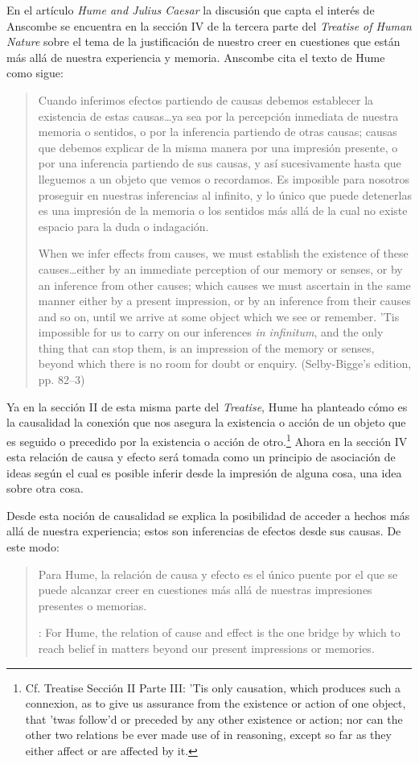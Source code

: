 En el artículo \emph{Hume and Julius Caesar} la discusión que capta el interés de Anscombe se encuentra en la sección IV de la tercera parte del \emph{Treatise of Human Nature} sobre el tema de la justificación de nuestro creer en cuestiones que están más allá de nuestra experiencia y memoria. Anscombe cita el texto de Hume como sigue: \blockquote[{\cite[86]{anscombe1981parmenides:humeandjulius}}When we infer effects from causes, we must establish the existence of these causes\ldots either by an immediate perception of our memory or senses, or by an inference from other causes; which causes we must ascertain in the same manner either by a present impression, or by an inference from their causes and so on, until we arrive at some object which we see or remember. 'Tis impossible for us to carry on our inferences \emph{in infinitum}, and the only thing that can stop them, is an impression of the memory or senses, beyond which there is no room for doubt or enquiry. (Selby-Bigge's edition, pp. 82--3)]{Cuando inferimos efectos partiendo de causas debemos establecer la existencia de estas causas\ldots ya sea por la percepción inmediata de nuestra memoria o sentidos, o por la inferencia partiendo de otras causas; causas que debemos explicar de la misma manera por una impresión presente, o por una inferencia partiendo de sus causas, y así sucesivamente hasta que lleguemos a un objeto que vemos o recordamos. Es imposible para nosotros proseguir en nuestras inferencias al infinito, y lo único que puede detenerlas es una impresión de la memoria o los sentidos más allá de la cual no existe espacio para la duda o indagación.}

Ya en la sección II de esta misma parte del \emph{Treatise}, Hume ha planteado cómo es la causalidad la conexión que nos asegura la existencia o acción de un objeto que es seguido o precedido por la existencia o acción de otro.\footnote{Cf. Treatise Sección II Parte III: ’Tis only causation, which produces such a connexion, as to give us assurance from the existence or action of one object, that ’twas follow’d or preceded by any other existence or action; nor can the other two relations be ever made use of in reasoning, except so far as they either affect or are affected by it. } Ahora en la sección IV esta relación de causa y efecto será tomada como un principio de asociación de ideas según el cual es posible inferir desde la impresión de alguna cosa, una idea sobre otra cosa.

Desde esta noción de causalidad se explica la posibilidad de acceder a hechos más allá de nuestra experiencia; estos son inferencias de efectos desde sus causas. De este modo: \blockquote[{\cite[87]{anscombe1981parmenides:humeandjulius}}: For Hume, the relation of cause and effect is the one bridge by which to reach belief in matters beyond our present impressions or memories.]{Para Hume, la relación de causa y efecto es el único puente por el que se puede alcanzar creer en cuestiones más allá de nuestras impresiones presentes o memorias.}

